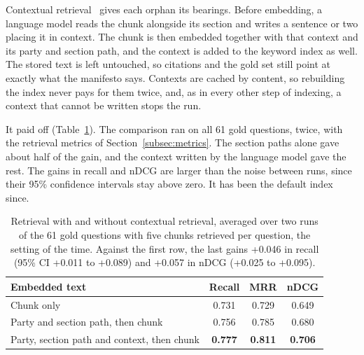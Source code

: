 Contextual retrieval~\citep{anthropic2024contextual} gives each orphan its
bearings. Before embedding, a language model reads the chunk alongside its
section and writes a sentence or two placing it in context. The chunk is then
embedded together with that context and its party and section path, and the
context is added to the keyword index as well. The stored text is left untouched, so citations and
the gold set still point at exactly what the manifesto says. Contexts are
cached by content, so rebuilding the index never pays for them twice, and, as
in every other step of indexing, a context that cannot be written stops the
run.

It paid off (Table~\ref{tab:contextual}). The comparison ran on all 61 gold
questions, twice, with the retrieval metrics of Section~\ref{subsec:metrics}.
The section paths alone gave about half of the gain, and the context written
by the language model gave the rest. The gains in recall and nDCG are larger
than the noise between runs, since their 95\% confidence intervals stay above
zero. It has been the default index since.

\begin{table}[H]
    \centering
    \begin{tabular}{|l|c|c|c|}
        \hline
        \textbf{Embedded text} & \textbf{Recall} & \textbf{MRR} & \textbf{nDCG} \\
        \hline
        Chunk only & 0.731 & 0.729 & 0.649 \\
        Party and section path, then chunk & 0.756 & 0.785 & 0.680 \\
        Party, section path and context, then chunk & \textbf{0.777} & \textbf{0.811} & \textbf{0.706} \\
        \hline
    \end{tabular}
    \caption[Contextual retrieval]{Retrieval with and without contextual
    retrieval, averaged over two runs of the 61 gold questions with five
    chunks retrieved per question, the setting of the time. Against the first
    row, the last gains +0.046 in recall (95\% CI +0.011 to +0.089) and +0.057
    in nDCG (+0.025 to +0.095).}
    \label{tab:contextual}
\end{table}

